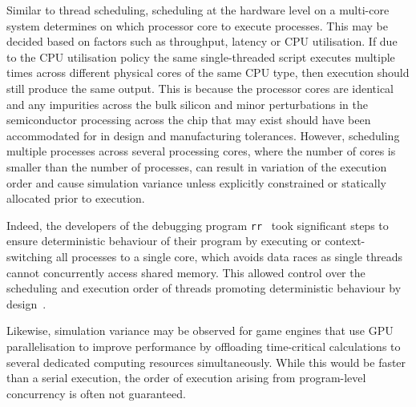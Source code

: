 \documentclass[runningheads,twocolumn,a4paper,10pt]{llncs}
\begin{document}
Similar to thread scheduling, scheduling at the hardware level on a multi-core system determines on which processor core to execute processes. This may be decided based on factors such as throughput, latency or CPU utilisation. 
%
If due to the CPU utilisation policy the same single-threaded script executes multiple times across different physical cores of the same CPU type,  then execution should still produce the same output. 
%
This is because the processor cores are identical and any impurities across the bulk silicon and minor perturbations in the semiconductor processing across the chip that may exist should have been accommodated for in design and manufacturing tolerances.
%
However, scheduling multiple processes across several processing cores, where the number of cores is smaller than the number of processes, can result in variation of the execution order and cause simulation variance unless explicitly constrained or statically allocated prior to execution. 

Indeed, the developers of the debugging program \texttt{rr}~\cite{RR_link} took significant steps to ensure deterministic behaviour of their program by executing or context-switching all processes to a single core, which avoids data races as single threads cannot concurrently access shared memory. This allowed control over the scheduling and execution order of threads promoting deterministic behaviour by design~\cite{acm-q-rr-interview}.
%

Likewise, simulation variance may be observed for game engines that use GPU parallelisation to improve performance by offloading time-critical calculations to several dedicated computing resources simultaneously. While this would be faster than a serial execution, the order of execution arising from program-level concurrency is often not guaranteed. 
\end{document}
